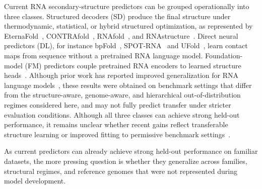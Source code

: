 \documentclass[pdflatex,sn-mathphys-num]{sn-jnl}%
\theoremstyle{thmstyleone}%
\theoremstyle{thmstyletwo}%
\theoremstyle{thmstylethree}%
\begin{document}
Current RNA secondary-structure predictors can be grouped operationally into three classes.
Structured decoders (SD) produce the final structure under thermodynamic, statistical, or hybrid structured optimization, as represented by EternaFold~\cite{waymentsteele2022rna}, CONTRAfold~\cite{do2006contrafold}, RNAfold~\cite{lorenz2011viennarna}, and RNAstructure~\cite{reuter2010rnastructure}.
Direct neural predictors (DL), for instance bpFold~\cite{zhu2025deep}, SPOT-RNA~\cite{singh2019rna} and UFold~\cite{fu2022ufold}, learn contact maps from sequence without a pretrained RNA language model.
Foundation-model (FM) predictors couple pretrained RNA encoders to learned structure heads~\cite{chen2022interpretable,zou2024large,penic2025rinalmo,yin2025ernie}.
Although prior work has reported improved generalization for RNA language models~\cite{penic2025rinalmo}, these results were obtained on benchmark settings that differ from the structure-aware, genome-aware, and hierarchical out-of-distribution regimes considered here, and may not fully predict transfer under stricter evaluation conditions.
Although all three classes can achieve strong held-out performance, it remains unclear whether recent gains reflect transferable structure learning or improved fitting to permissive benchmark settings~\cite{qiu2023sequence,szikszai2022deep,zhu2025deep}.

As current predictors can already achieve strong held-out performance on familiar datasets, the more pressing question is whether they generalize across families, structural regimes, and reference genomes that were not represented during model development.
\end{document}
